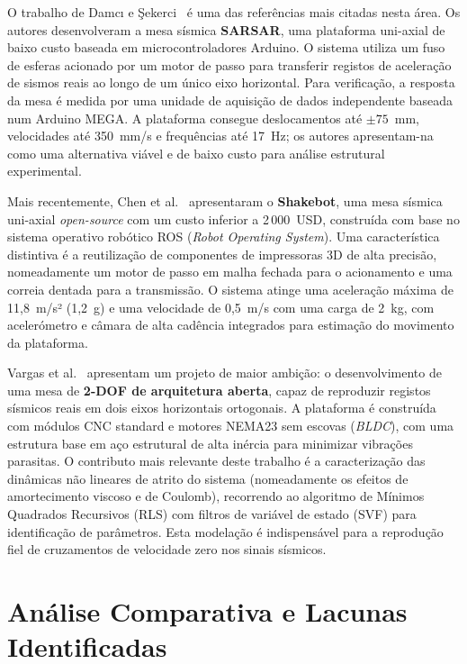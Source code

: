 O trabalho de Damcı e Şekerci~\cite{Damci2018} é uma das referências mais citadas nesta área. Os autores desenvolveram a mesa sísmica \textbf{SARSAR}, uma plataforma uni-axial de baixo custo baseada em microcontroladores Arduino. O sistema utiliza um fuso de esferas acionado por um motor de passo para transferir registos de aceleração de sismos reais ao longo de um único eixo horizontal. Para verificação, a resposta da mesa é medida por uma unidade de aquisição de dados independente baseada num Arduino MEGA. A plataforma consegue deslocamentos até $\pm75$~mm, velocidades até 350~mm/s e frequências até 17~Hz; os autores apresentam-na como uma alternativa viável e de baixo custo para análise estrutural experimental.

Mais recentemente, Chen et al.~\cite{Shakebot2022} apresentaram o \textbf{Shakebot}, uma mesa sísmica uni-axial \textit{open-source} com um custo inferior a 2\,000~USD, construída com base no sistema operativo robótico ROS (\textit{Robot Operating System}). Uma característica distintiva é a reutilização de componentes de impressoras 3D de alta precisão, nomeadamente um motor de passo em malha fechada para o acionamento e uma correia dentada para a transmissão. O sistema atinge uma aceleração máxima de 11,8~m/s² (1,2~g) e uma velocidade de 0,5~m/s com uma carga de 2~kg, com acelerómetro e câmara de alta cadência integrados para estimação do movimento da plataforma.

Vargas et al.~\cite{2DOF2025} apresentam um projeto de maior ambição: o desenvolvimento de uma mesa de \textbf{2-DOF de arquitetura aberta}, capaz de reproduzir registos sísmicos reais em dois eixos horizontais ortogonais. A plataforma é construída com módulos CNC standard e motores NEMA23 sem escovas (\textit{BLDC}), com uma estrutura base em aço estrutural de alta inércia para minimizar vibrações parasitas. O contributo mais relevante deste trabalho é a caracterização das dinâmicas não lineares de atrito do sistema (nomeadamente os efeitos de amortecimento viscoso e de Coulomb), recorrendo ao algoritmo de Mínimos Quadrados Recursivos (RLS) com filtros de variável de estado (SVF) para identificação de parâmetros. Esta modelação é indispensável para a reprodução fiel de cruzamentos de velocidade zero nos sinais sísmicos.

\section{Análise Comparativa e Lacunas Identificadas}
\label{sec:comparativo}

